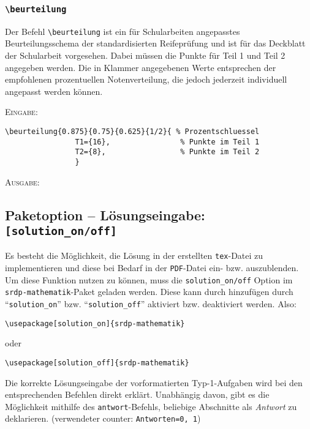 \documentclass[a4paper,12pt]{article}
\begin{document}
\subsubsection{\texttt{\textbackslash beurteilung}}

Der Befehl \texttt{\textbackslash beurteilung} ist ein für Schularbeiten angepasstes Beurteilungsschema der standardisierten Reifeprüfung und ist für das Deckblatt der Schularbeit vorgesehen. Dabei müssen die Punkte für Teil 1 und Teil 2 angegeben werden. Die in Klammer angegebenen Werte entsprechen der empfohlenen prozentuellen Notenverteilung, die jedoch jederzeit individuell angepasst werden können. \leer  


\textsc{Eingabe:}
\begin{verbatim}
\beurteilung{0.875}{0.75}{0.625}{1/2}{ % Prozentschluessel
				T1={16}, 				% Punkte im Teil 1  
				T2={8}, 				% Punkte im Teil 2
				}

\end{verbatim}
\textsc{Ausgabe:}\leer


\newpage

\subsection{Paketoption -- Lösungseingabe: \texttt{[solution\_on/off]}}

Es besteht die Möglichkeit, die Lösung in der erstellten \texttt{tex}-Datei zu implementieren und diese bei Bedarf in der \texttt{PDF}-Datei ein- bzw. auszublenden. Um diese Funktion nutzen zu können, muss die \texttt{solution\_on/off} Option im \texttt{srdp-mathematik}-Paket geladen werden. Diese kann durch hinzufügen durch "`\texttt{solution\_on}"' bzw. "`\texttt{solution\_off}"' aktiviert bzw. deaktiviert werden. Also:

\begin{verbatim}
\usepackage[solution_on]{srdp-mathematik}
\end{verbatim}

oder

\begin{verbatim}
\usepackage[solution_off]{srdp-mathematik}
\end{verbatim}


Die korrekte Lösungseingabe der vorformatierten Typ-1-Aufgaben wird bei den entsprechenden Befehlen direkt erklärt. Unabhängig davon, gibt es die Möglichkeit mithilfe des \texttt{antwort}-Befehls, beliebige Abschnitte als \textit{Antwort} zu deklarieren. (verwendeter counter: \texttt{Antworten=0, 1})   
\end{document}
